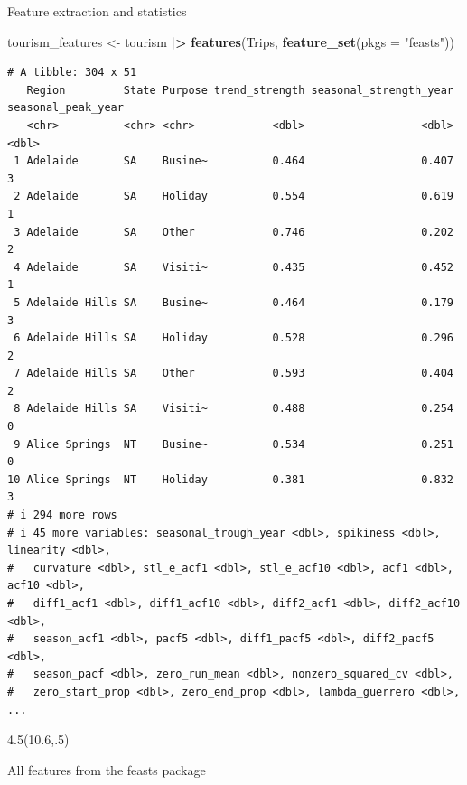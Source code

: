 \documentclass[
  14pt,
  ignorenonframetext,
  aspectratio=169,
]{beamer}
\newenvironment{Shaded}{\begin{snugshade}}{\end{snugshade}}
\newcommand{\AttributeTok}[1]{\textcolor[rgb]{0.13,0.29,0.53}{#1}}
\newcommand{\FunctionTok}[1]{\textcolor[rgb]{0.13,0.29,0.53}{\textbf{#1}}}
\newcommand{\NormalTok}[1]{#1}
\newcommand{\OtherTok}[1]{\textcolor[rgb]{0.56,0.35,0.01}{#1}}
\newcommand{\SpecialCharTok}[1]{\textcolor[rgb]{0.81,0.36,0.00}{\textbf{#1}}}
\newcommand{\StringTok}[1]{\textcolor[rgb]{0.31,0.60,0.02}{#1}}
\renewenvironment{Shaded}{\vspace*{0.15cm}\color{black}\fontsize{10}{10}\sf\begin{snugshade}\color{black}}{\end{snugshade}}
\begin{document}
\begin{frame}[fragile]{Feature extraction and statistics}
\protect{}\label{feature-extraction-and-statistics-5}
\begin{Shaded}
\begin{Highlighting}[]
\NormalTok{tourism\_features }\OtherTok{\textless{}{-}}\NormalTok{ tourism }\SpecialCharTok{|\textgreater{}}
  \FunctionTok{features}\NormalTok{(Trips, }\FunctionTok{feature\_set}\NormalTok{(}\AttributeTok{pkgs =} \StringTok{"feasts"}\NormalTok{))}
\end{Highlighting}
\end{Shaded}

\fontsize{8}{8}\sf\vspace*{-0.3cm}

\begin{verbatim}
# A tibble: 304 x 51
   Region         State Purpose trend_strength seasonal_strength_year seasonal_peak_year
   <chr>          <chr> <chr>            <dbl>                  <dbl>              <dbl>
 1 Adelaide       SA    Busine~          0.464                  0.407                  3
 2 Adelaide       SA    Holiday          0.554                  0.619                  1
 3 Adelaide       SA    Other            0.746                  0.202                  2
 4 Adelaide       SA    Visiti~          0.435                  0.452                  1
 5 Adelaide Hills SA    Busine~          0.464                  0.179                  3
 6 Adelaide Hills SA    Holiday          0.528                  0.296                  2
 7 Adelaide Hills SA    Other            0.593                  0.404                  2
 8 Adelaide Hills SA    Visiti~          0.488                  0.254                  0
 9 Alice Springs  NT    Busine~          0.534                  0.251                  0
10 Alice Springs  NT    Holiday          0.381                  0.832                  3
# i 294 more rows
# i 45 more variables: seasonal_trough_year <dbl>, spikiness <dbl>, linearity <dbl>,
#   curvature <dbl>, stl_e_acf1 <dbl>, stl_e_acf10 <dbl>, acf1 <dbl>, acf10 <dbl>,
#   diff1_acf1 <dbl>, diff1_acf10 <dbl>, diff2_acf1 <dbl>, diff2_acf10 <dbl>,
#   season_acf1 <dbl>, pacf5 <dbl>, diff1_pacf5 <dbl>, diff2_pacf5 <dbl>,
#   season_pacf <dbl>, zero_run_mean <dbl>, nonzero_squared_cv <dbl>,
#   zero_start_prop <dbl>, zero_end_prop <dbl>, lambda_guerrero <dbl>, ...
\end{verbatim}

\begin{textblock}{4.5}(10.6,.5)
\begin{alertblock}{}\fontsize{10}{12}\sf
All features from the feasts package
\end{alertblock}
\end{textblock}
\end{frame}
\end{document}
